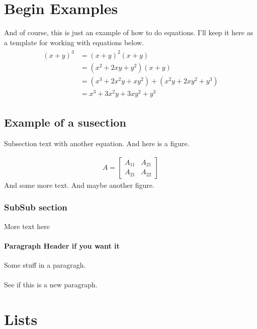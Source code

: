 \documentclass[paper=a4, fontsize=11pt]{scrartcl}
\numberwithin{equation}{section}		%
\numberwithin{figure}{section}			%
\numberwithin{table}{section}				%
\begin{document}
\section{Begin Examples}
And of course, this is just an example of how to do equations.  I'll keep it here as a template for working with equations below.
\begin{align} 
	\begin{split}
	(x+y)^3 	&= (x+y)^2(x+y)\\
					&=(x^2+2xy+y^2)(x+y)\\
					&=(x^3+2x^2y+xy^2) + (x^2y+2xy^2+y^3)\\
					&=x^3+3x^2y+3xy^2+y^3
	\end{split}					
\end{align}

\subsection{Example of a susection}
Subsection text with another equation.  And here is a figure.

\begin{align}
	A = 
	\begin{bmatrix}
	A_{11} & A_{21} \\
  	A_{21} & A_{22}
	\end{bmatrix}
\end{align}
And some more text. And maybe another figure.

\subsubsection{SubSub section}
More text here

\paragraph{Paragraph Header if you want it}
Some stuff in a paragragh.

\paragraph{}
See if this is a new paragraph.


\section{Lists}
\end{document}
